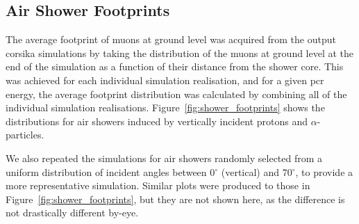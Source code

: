 \subsection{Air Shower Footprints}\label{sec:CORSIKA_footprint}

The average footprint of muons at ground level was acquired from the output \gls{corsika} simulations by taking the distribution of the muons at ground level at the end of the simulation as a function of their distance from the shower core. This was achieved for each individual simulation realisation, and for a given \gls{pcr} energy, the average footprint distribution was calculated by combining all of the individual simulation realisations. Figure~\ref{fig:shower_footprints} shows the distributions for air showers induced by vertically incident protons and $\alpha$-particles.

We also repeated the simulations for air showers randomly selected from a uniform distribution of incident angles between 0$^\circ$ (vertical) and 70$^\circ$, to provide a more representative simulation. Similar plots were produced to those in Figure~\ref{fig:shower_footprints}, but they are not shown here, as the difference is not drastically different by-eye.


